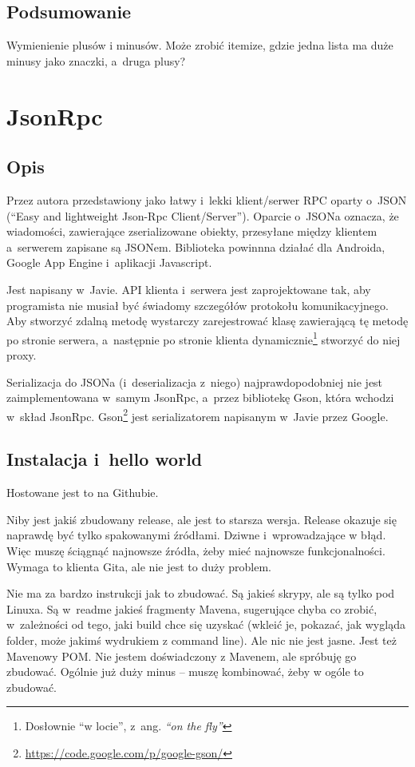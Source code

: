 \subsection{Podsumowanie}
Wymienienie plusów i minusów. Może zrobić itemize, gdzie jedna lista ma duże minusy jako znaczki, a~druga plusy?



\section{JsonRpc}
\subsection{Opis}
Przez autora przedstawiony jako łatwy i~lekki klient/serwer RPC oparty o~JSON (``Easy and lightweight Json-Rpc Client/Server'')\cite{json-rpc}.
Oparcie o~JSONa oznacza, że wiadomości, zawierające zserializowane obiekty, przesyłane między klientem a~serwerem zapisane są JSONem. Biblioteka powinnna działać dla Androida, Google App Engine i~aplikacji Javascript.

Jest napisany w~Javie.
API klienta i~serwera jest zaprojektowane tak, aby programista nie musiał być świadomy szczegółów protokołu komunikacyjnego.
Aby stworzyć zdalną metodę wystarczy zarejestrować klasę zawierającą tę metodę po stronie serwera, a~następnie po stronie klienta dynamicznie\footnote{Dosłownie ``w locie'', z~ang. \emph{``on the fly''}} stworzyć do niej proxy.

Serializacja do JSONa (i~deserializacja z~niego) najprawdopodobniej nie jest zaimplementowana w~samym JsonRpc, a~przez bibliotekę Gson, która wchodzi w~skład JsonRpc. Gson\footnote{\url{https://code.google.com/p/google-gson/}} jest serializatorem napisanym w~Javie przez Google.
 
\subsection{Instalacja i~hello world}
Hostowane jest to na Githubie.

Niby jest jakiś zbudowany release, ale jest to starsza wersja. Release okazuje się naprawdę być tylko spakowanymi źródłami. Dziwne i~wprowadzające w błąd.
Więc muszę ściągnąć najnowsze źródła, żeby mieć najnowsze funkcjonalności.
Wymaga to klienta Gita, ale nie jest to duży problem. 

Nie ma za bardzo instrukcji jak to zbudować. Są jakieś skrypy, ale są tylko pod Linuxa. Są w~readme jakieś fragmenty Mavena, sugerujące chyba co zrobić, w~zależności od tego, jaki build chce się uzyskać (wkleić je, pokazać, jak wygląda folder, może jakimś wydrukiem z command line). Ale nic nie jest jasne.
Jest też Mavenowy POM. Nie jestem doświadczony z Mavenem, ale spróbuję go zbudować. Ogólnie już duży minus -- muszę kombinować, żeby w ogóle to zbudować.

